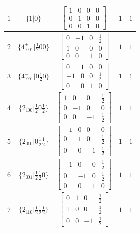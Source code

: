 \documentclass[fleqn,8pt]{jsarticle}
\begin{document}
\begin{longtable}{ccccc}
$ 1 $ & $ \{1|0\} $ & $ \begin{bmatrix} 1 & 0 & 0 & 0 \\ 0 & 1 & 0 & 0 \\ 0 & 0 & 1 & 0 \end{bmatrix} $ & $ 1 $ & $ 1 $ \\ \hline
$ 2 $ & $ \{4^{+}_{\,\,001}|\frac{1}{2} 0 0\} $ & $ \begin{bmatrix} 0 & -1 & 0 & \frac{1}{2} \\ 1 & 0 & 0 & 0 \\ 0 & 0 & 1 & 0 \end{bmatrix} $ & $ 1 $ & $ 1 $ \\ \hline
$ 3 $ & $ \{4^{-}_{\,\,001}|0 \frac{1}{2} 0\} $ & $ \begin{bmatrix} 0 & 1 & 0 & 0 \\ -1 & 0 & 0 & \frac{1}{2} \\ 0 & 0 & 1 & 0 \end{bmatrix} $ & $ 1 $ & $ 1 $ \\ \hline
$ 4 $ & $ \{2{}_{100}|\frac{1}{2} 0 \frac{1}{2}\} $ & $ \begin{bmatrix} 1 & 0 & 0 & \frac{1}{2} \\ 0 & -1 & 0 & 0 \\ 0 & 0 & -1 & \frac{1}{2} \end{bmatrix} $ & $ 1 $ & $ 1 $ \\ \hline
$ 5 $ & $ \{2{}_{010}|0 \frac{1}{2} \frac{1}{2}\} $ & $ \begin{bmatrix} -1 & 0 & 0 & 0 \\ 0 & 1 & 0 & \frac{1}{2} \\ 0 & 0 & -1 & \frac{1}{2} \end{bmatrix} $ & $ 1 $ & $ 1 $ \\ \hline
$ 6 $ & $ \{2{}_{001}|\frac{1}{2} \frac{1}{2} 0\} $ & $ \begin{bmatrix} -1 & 0 & 0 & \frac{1}{2} \\ 0 & -1 & 0 & \frac{1}{2} \\ 0 & 0 & 1 & 0 \end{bmatrix} $ & $ 1 $ & $ 1 $ \\ \hline
$ 7 $ & $ \{2{}_{110}|\frac{1}{2} \frac{1}{2} \frac{1}{2}\} $ & $ \begin{bmatrix} 0 & 1 & 0 & \frac{1}{2} \\ 1 & 0 & 0 & \frac{1}{2} \\ 0 & 0 & -1 & \frac{1}{2} \end{bmatrix} $ & $ 1 $ & $ 1 $ \\ \hline

\end{longtable}
\end{document}
